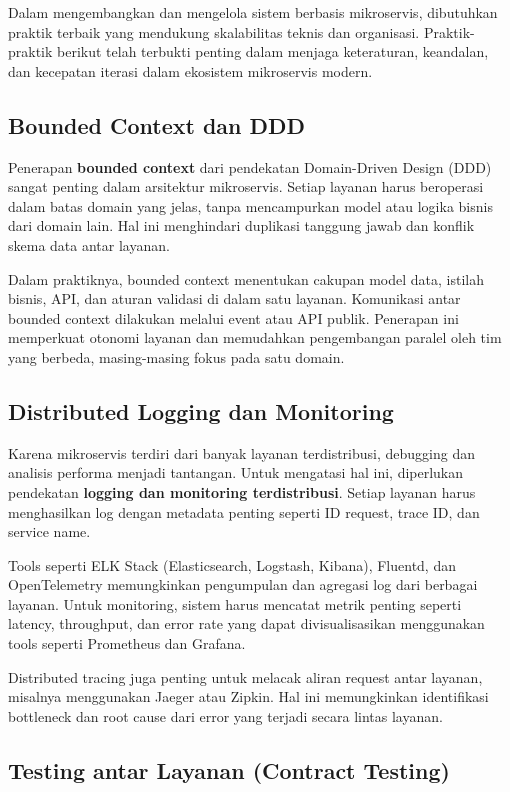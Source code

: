 Dalam mengembangkan dan mengelola sistem berbasis mikroservis, dibutuhkan praktik terbaik yang mendukung skalabilitas teknis dan organisasi. Praktik-praktik berikut telah terbukti penting dalam menjaga keteraturan, keandalan, dan kecepatan iterasi dalam ekosistem mikroservis modern.

\subsection{Bounded Context dan DDD}

Penerapan \textbf{bounded context} dari pendekatan Domain-Driven Design (DDD) sangat penting dalam arsitektur mikroservis. Setiap layanan harus beroperasi dalam batas domain yang jelas, tanpa mencampurkan model atau logika bisnis dari domain lain. Hal ini menghindari duplikasi tanggung jawab dan konflik skema data antar layanan.

Dalam praktiknya, bounded context menentukan cakupan model data, istilah bisnis, API, dan aturan validasi di dalam satu layanan. Komunikasi antar bounded context dilakukan melalui event atau API publik. Penerapan ini memperkuat otonomi layanan dan memudahkan pengembangan paralel oleh tim yang berbeda, masing-masing fokus pada satu domain.

\subsection{Distributed Logging dan Monitoring}

Karena mikroservis terdiri dari banyak layanan terdistribusi, debugging dan analisis performa menjadi tantangan. Untuk mengatasi hal ini, diperlukan pendekatan \textbf{logging dan monitoring terdistribusi}. Setiap layanan harus menghasilkan log dengan metadata penting seperti ID request, trace ID, dan service name.

Tools seperti ELK Stack (Elasticsearch, Logstash, Kibana), Fluentd, dan OpenTelemetry memungkinkan pengumpulan dan agregasi log dari berbagai layanan. Untuk monitoring, sistem harus mencatat metrik penting seperti latency, throughput, dan error rate yang dapat divisualisasikan menggunakan tools seperti Prometheus dan Grafana.

Distributed tracing juga penting untuk melacak aliran request antar layanan, misalnya menggunakan Jaeger atau Zipkin. Hal ini memungkinkan identifikasi bottleneck dan root cause dari error yang terjadi secara lintas layanan.

\subsection{Testing antar Layanan (Contract Testing)}

